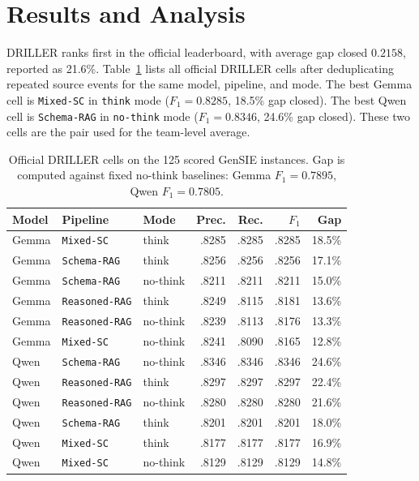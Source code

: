 \section{Results and Analysis}

DRILLER ranks first in the official leaderboard, with average gap closed \(0.2158\), reported as 21.6\%. Table~\ref{tab:main-results} lists all official DRILLER cells after deduplicating repeated source events for the same model, pipeline, and mode. The best Gemma cell is \texttt{Mixed-SC} in \texttt{think} mode (\(F_1=0.8285\), 18.5\% gap closed). The best Qwen cell is \texttt{Schema-RAG} in \texttt{no-think} mode (\(F_1=0.8346\), 24.6\% gap closed). These two cells are the pair used for the team-level average.

\begin{table}[!htbp]
\centering
\caption{Official DRILLER cells on the 125 scored GenSIE instances. Gap is computed against fixed no-think baselines: Gemma \(F_1=0.7895\), Qwen \(F_1=0.7805\).}
\label{tab:main-results}
\scriptsize
\begin{tabular}{@{}lllrrrr@{}}
\toprule
Model & Pipeline & Mode & Prec. & Rec. & \(F_1\) & Gap \\
\midrule
Gemma & \texttt{Mixed-SC} & think & .8285 & .8285 & .8285 & 18.5\% \\
Gemma & \texttt{Schema-RAG} & think & .8256 & .8256 & .8256 & 17.1\% \\
Gemma & \texttt{Schema-RAG} & no-think & .8211 & .8211 & .8211 & 15.0\% \\
Gemma & \texttt{Reasoned-RAG} & think & .8249 & .8115 & .8181 & 13.6\% \\
Gemma & \texttt{Reasoned-RAG} & no-think & .8239 & .8113 & .8176 & 13.3\% \\
Gemma & \texttt{Mixed-SC} & no-think & .8241 & .8090 & .8165 & 12.8\% \\
\midrule
Qwen & \texttt{Schema-RAG} & no-think & .8346 & .8346 & .8346 & 24.6\% \\
Qwen & \texttt{Reasoned-RAG} & think & .8297 & .8297 & .8297 & 22.4\% \\
Qwen & \texttt{Reasoned-RAG} & no-think & .8280 & .8280 & .8280 & 21.6\% \\
Qwen & \texttt{Schema-RAG} & think & .8201 & .8201 & .8201 & 18.0\% \\
Qwen & \texttt{Mixed-SC} & think & .8177 & .8177 & .8177 & 16.9\% \\
Qwen & \texttt{Mixed-SC} & no-think & .8129 & .8129 & .8129 & 14.8\% \\
\bottomrule
\end{tabular}
\end{table}

